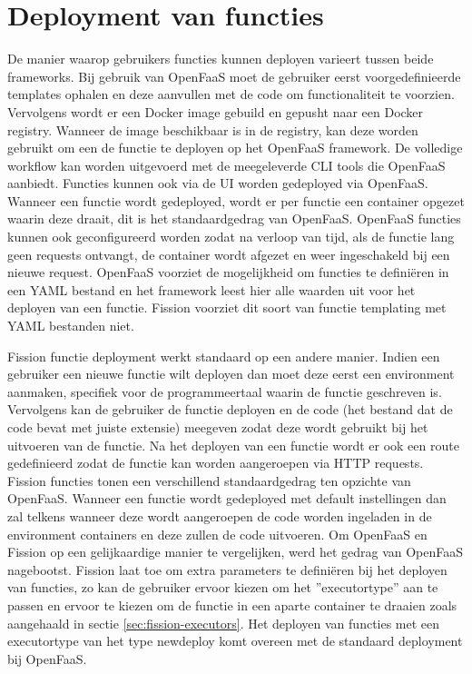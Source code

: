 \section{Deployment van functies}
De manier waarop gebruikers functies kunnen deployen varieert tussen beide frameworks. Bij gebruik van OpenFaaS moet de gebruiker eerst voorgedefinieerde templates ophalen en deze aanvullen met de code om functionaliteit te voorzien. Vervolgens wordt er een Docker image gebuild en gepusht naar een Docker registry. Wanneer de image beschikbaar is in de registry, kan deze worden gebruikt om een de functie te deployen op het OpenFaaS framework. De volledige workflow kan worden uitgevoerd met de meegeleverde CLI tools die OpenFaaS aanbiedt. Functies kunnen ook via de UI worden gedeployed via OpenFaaS. Wanneer een functie wordt gedeployed, wordt er per functie een container opgezet waarin deze draait, dit is het standaardgedrag van OpenFaaS. OpenFaaS functies kunnen ook geconfigureerd worden zodat na verloop van tijd, als de functie lang geen requests ontvangt, de container wordt afgezet en weer ingeschakeld bij een nieuwe request. OpenFaaS voorziet de mogelijkheid om functies te definiëren in een YAML bestand en het framework leest hier alle waarden uit voor het deployen van een functie. Fission voorziet dit soort van functie templating met YAML bestanden niet.


Fission functie deployment werkt standaard op een andere manier. Indien een gebruiker een nieuwe functie wilt deployen dan moet deze eerst een environment aanmaken, specifiek voor de programmeertaal waarin de functie geschreven is. Vervolgens kan de gebruiker de functie deployen en de code (het bestand dat de code bevat met juiste extensie) meegeven zodat deze wordt gebruikt bij het uitvoeren van de functie. Na het deployen van een functie wordt er ook een route gedefinieerd zodat de functie kan worden aangeroepen via HTTP requests. Fission functies tonen een verschillend standaardgedrag ten opzichte van OpenFaaS. Wanneer een functie wordt gedeployed met default instellingen dan zal telkens wanneer deze wordt aangeroepen de code worden ingeladen in de environment containers en deze zullen de code uitvoeren. Om OpenFaaS en Fission op een gelijkaardige manier te vergelijken, werd het gedrag van OpenFaaS nagebootst. Fission laat toe om extra parameters te definiëren bij het deployen van functies, zo kan de gebruiker ervoor kiezen om het ''executortype'' aan te passen en ervoor te kiezen om de functie in een aparte container te draaien zoals aangehaald in sectie \ref{sec:fission-executors}. Het deployen van functies met een executortype van het type newdeploy komt overeen met de standaard deployment bij OpenFaaS.


